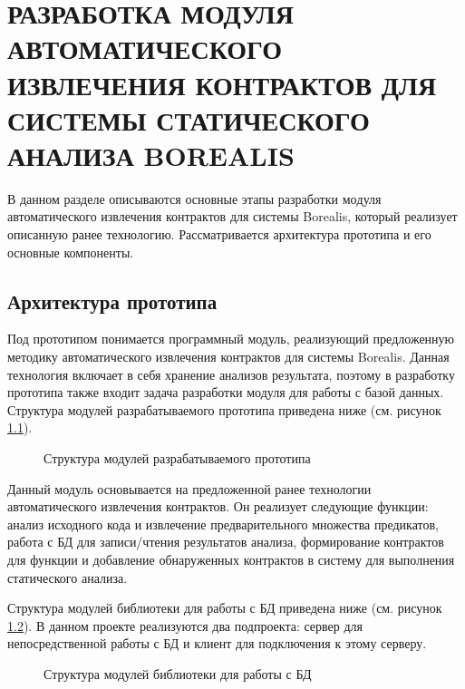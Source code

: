 \chapter{РАЗРАБОТКА МОДУЛЯ АВТОМАТИЧЕСКОГО ИЗВЛЕЧЕНИЯ КОНТРАКТОВ ДЛЯ СИСТЕМЫ СТАТИЧЕСКОГО АНАЛИЗА BOREALIS}
\label{chapter:developing}
В данном разделе описываются основные этапы разработки мо­дуля автоматического извлечения контрактов для системы Borealis, который реализует описанную ранее технологию. Рассматривается архитектура прототипа и его основные компоненты.

\section{Архитектура прототипа}
Под прототипом понимается программный модуль, реализующий предложенную методику автоматического извлечения контрактов для системы Borealis. Данная технология включает в себя хранение анализов результата, поэтому в разработку прототипа  также входит задача разработки модуля для работы с базой данных. Структура модулей разрабатываемого прототипа приведена ниже (см. рисунок \ref{image:borealisStructure}).
\begin{figure}[h!]
\caption{Структура модулей разрабатываемого прототипа}
\label{image:borealisStructure}
\end{figure}

Данный модуль основывается на предложенной ранее технологии автоматического извлечения контрактов. Он реализует следующие функции: анализ исходного кода и извлечение предварительного множества предикатов, работа с БД для записи/чтения результатов анализа, формирование контрактов для функции и добавление обнаруженных контрактов в систему для выполнения статического анализа.

Структура модулей библиотеки для работы с БД приведена ниже (см. рисунок \ref{image:leveldbStructure}). В данном проекте реализуются два подпроекта: сервер для непосредственной работы с БД и клиент для подключения к этому серверу.
\begin{figure}[h!]
\caption{Структура модулей библиотеки для работы с БД}
\label{image:leveldbStructure}
\end{figure}

